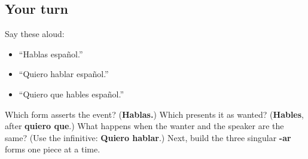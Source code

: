 \subsection*{Your turn}
Say these aloud:

\begin{itemize}
\raggedright
  \item “Hablas español.”
  \item “Quiero hablar español.”
  \item “Quiero que hables español.”
\end{itemize}

\begin{tcolorbox}[breakable,colback=teal!4,colframe=teal!35!black,title={Before you move on}]
Which form asserts the event? (\textbf{Hablas.}) Which presents it as wanted? (\textbf{Hables}, after \textbf{quiero que}.) What happens when the wanter and the speaker are the same? (Use the infinitive: \textbf{Quiero hablar}.) Next, build the three singular \textbf{-ar} forms one piece at a time.
\end{tcolorbox}

